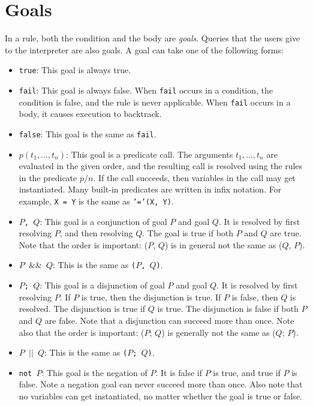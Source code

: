 \section{Goals}
In a rule, both the condition and the body are \emph{goals}. Queries that the users give to the interpreter are also goals. A goal can take one of the following forms:
\begin{itemize}
\item \texttt{true}: This goal is always true.
\item \texttt{fail}: This goal is always false. When \texttt{fail} occurs in a condition, the condition is false, and the rule is never applicable. When \texttt{fail} occurs in a body, it causes execution to backtrack.
\item \texttt{false}: This goal is the same as \texttt{fail}.
\item $p(t_1, \ldots, t_n)$: This goal is a predicate call. The arguments $t_1, \ldots, t_n$ are evaluated in the given order, and the resulting call is resolved using the rules in the predicate $p/n$. If the call succeeds, then variables in the call may get instantiated. Many built-in predicates are written in infix notation. For example, \texttt{X = Y} is the same as \texttt{'='(X, Y)}.
\item \texttt{$P$, $Q$}: This goal is a conjunction of goal $P$ and goal $Q$. It is resolved by first resolving $P$, and then resolving $Q$. The goal is true if both $P$ and $Q$ are true. Note that the order is important: ($P$, $Q$) is in general not the same as ($Q$, $P$).
\item \texttt{$P$ $\&\&$ $Q$}: This is the same as \texttt{($P$, $Q$)}. 
\item \texttt{$P$; $Q$}: This goal is a disjunction of goal $P$ and goal $Q$. It is resolved by first resolving $P$. If $P$ is true, then the disjunction is true. If $P$ is false, then $Q$ is resolved. The disjunction is true if $Q$ is true. The disjunction is false if both $P$ and $Q$ are false. Note that a disjunction can succeed more than once. Note also that the order is important: ($P$; $Q$) is generally not the same as ($Q$; $P$).
\item \texttt{$P$ $|$$|$ $Q$}: This is the same as \texttt{($P$; $Q$)}.
\item \texttt{not $P$}: This goal is the negation of $P$. It is false if $P$ is true, and true if $P$ is false.  Note a negation goal can never succeed more than once.  Also note that no variables can get instantiated, no matter whether the goal is true or false.

\end{itemize}
